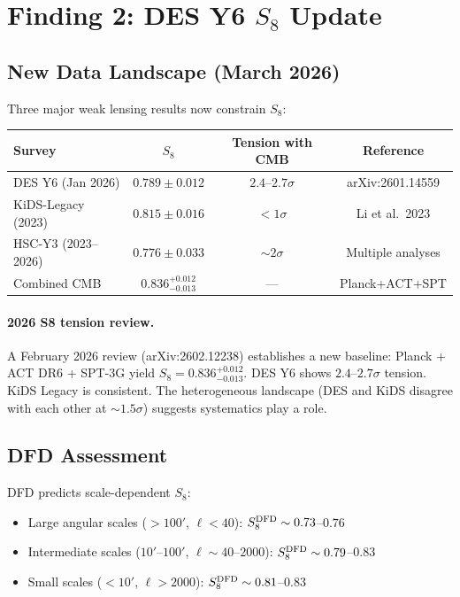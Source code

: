 \documentclass[11pt,a4paper]{article}
\begin{document}
\section{Finding 2: DES Y6 $S_8$ Update}
\label{sec:S8-update}

\subsection{New Data Landscape (March 2026)}

Three major weak lensing results now constrain $S_8$:

\begin{center}
\begin{tabular}{lccc}
\toprule
Survey & $S_8$ & Tension with CMB & Reference \\
\midrule
DES Y6 (Jan 2026) & $0.789 \pm 0.012$ & $2.4$--$2.7\sigma$ & arXiv:2601.14559 \\
KiDS-Legacy (2023) & $0.815 \pm 0.016$ & $< 1\sigma$ & Li et al.\ 2023 \\
HSC-Y3 (2023--2026) & $0.776 \pm 0.033$ & $\sim 2\sigma$ & Multiple analyses \\
Combined CMB & $0.836^{+0.012}_{-0.013}$ & --- & Planck+ACT+SPT \\
\bottomrule
\end{tabular}
\end{center}

\paragraph{2026 S8 tension review.}
A February 2026 review (arXiv:2602.12238) establishes a new
baseline: Planck + ACT DR6 + SPT-3G yield
$S_8 = 0.836^{+0.012}_{-0.013}$.  DES Y6 shows $2.4$--$2.7\sigma$
tension.  KiDS Legacy is consistent.  The heterogeneous landscape
(DES and KiDS disagree with each other at $\sim 1.5\sigma$)
suggests systematics play a role.

\subsection{DFD Assessment}

DFD predicts scale-dependent $S_8$:
\begin{itemize}
\item Large angular scales ($> 100'$, $\ell < 40$):
  $S_8^{\rm DFD} \sim 0.73$--$0.76$
\item Intermediate scales ($10'$--$100'$, $\ell \sim 40$--$2000$):
  $S_8^{\rm DFD} \sim 0.79$--$0.83$
\item Small scales ($< 10'$, $\ell > 2000$):
  $S_8^{\rm DFD} \sim 0.81$--$0.83$
\end{itemize}
\end{document}
